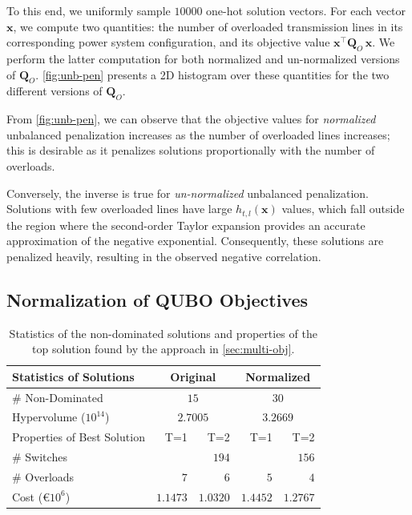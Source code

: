 \documentclass[conference]{IEEEtran}
\makeatletter
\newcommand{\bQ}{\boldsymbol{Q}}
\newcommand{\trans}{\intercal}
\newcommand{\bx}{\boldsymbol{x}}
\newcommand{\QUBO}{\textsc{QUBO}\@\xspace}
\makeatother
\begin{document}
To this end, we uniformly sample $10000$ one-hot solution vectors. For
each vector $\bx$, we compute two quantities: the number of overloaded
transmission lines in its corresponding power system configuration, and
its objective value $\bx^{\trans}\bQ_{O}\,\bx$. We perform the latter
computation for both normalized and un-normalized versions of
$\bQ_{O}$. \cref{fig:unb-pen} presents a 2D histogram over these
quantities for the two different versions of $\bQ_{O}$.

From \cref{fig:unb-pen}, we can observe that the objective values for
\textit{normalized} unbalanced penalization increases as the number of
overloaded lines increases; this is desirable as it penalizes solutions
proportionally with the number of overloads.

Conversely, the inverse is true for \textit{un-normalized} unbalanced
penalization. Solutions with few overloaded lines have large
$h_{t,l}(\bx)$ values, which fall outside the region where the
second-order Taylor expansion provides an accurate approximation of the
negative exponential. Consequently, these solutions are penalized
heavily, resulting in the observed negative correlation.

\subsection{Normalization of {\QUBO} Objectives}\label{sec:energy-norm}
\newcommand{\sd}[1]{\scriptsize $\pm #1$}
\begin{table}[!t]
  \caption{Statistics of the non-dominated solutions and properties of
    the top solution found by the approach in \cref{sec:multi-obj}.}
  \label{tab:pf}
  \centering
  \begin{tabular}{l r r r r}
    \toprule
    Statistics of Solutions
    & \multicolumn{2}{c}{Original}
    & \multicolumn{2}{c}{Normalized}\\
    \midrule
    {\# Non-Dominated}
    &\multicolumn{2}{c}{$15$} & \multicolumn{2}{c}{$30$}\\
    {Hypervolume ($10^{14}$)}
    &\multicolumn{2}{c}{$2.7005$}
    &\multicolumn{2}{c}{$3.2669$}\\
    \midrule
    Properties of Best Solution
    & T=1 & T=2 & T=1 & T=2\\
    \midrule
    \# Switches
    &\multicolumn{2}{r}{$194$} & \multicolumn{2}{r}{$156$}\\
    \# Overloads
    &{$7$} &$6$ &{$5$} &$4$\\
    Cost (€$10^{6}$)
    &{$1.1473$} &$1.0320$ &{$1.4452$} &$1.2767$\\
    \bottomrule
  \end{tabular}
\end{table}
\end{document}
